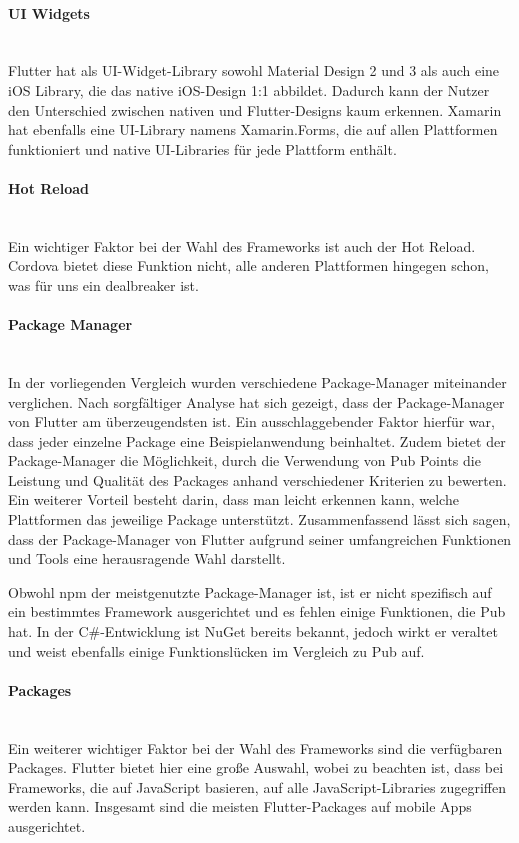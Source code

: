 \paragraph{UI Widgets}\mbox{} \\
Flutter hat als UI-Widget-Library sowohl Material Design 2 und 3 als auch eine iOS Library, die das native iOS-Design 1:1 abbildet. Dadurch kann der Nutzer den Unterschied zwischen nativen und Flutter-Designs kaum erkennen. Xamarin hat ebenfalls eine UI-Library namens Xamarin.Forms, die auf allen Plattformen funktioniert und native UI-Libraries für jede Plattform enthält.

\paragraph{Hot Reload}\mbox{} \\
Ein wichtiger Faktor bei der Wahl des Frameworks ist auch der Hot Reload. Cordova bietet diese Funktion nicht, alle anderen Plattformen hingegen schon, was für uns ein dealbreaker ist.

\paragraph{Package Manager}\mbox{} \\
In der vorliegenden Vergleich wurden verschiedene Package-Manager miteinander verglichen. Nach sorgfältiger Analyse hat sich gezeigt, dass der Package-Manager von Flutter am überzeugendsten ist. Ein ausschlaggebender Faktor hierfür war, dass jeder einzelne Package eine Beispielanwendung beinhaltet. Zudem bietet der Package-Manager die Möglichkeit, durch die Verwendung von Pub Points die Leistung und Qualität des Packages anhand verschiedener Kriterien zu bewerten. Ein weiterer Vorteil besteht darin, dass man leicht erkennen kann, welche Plattformen das jeweilige Package unterstützt. Zusammenfassend lässt sich sagen, dass der Package-Manager von Flutter aufgrund seiner umfangreichen Funktionen und Tools eine herausragende Wahl darstellt.


Obwohl npm der meistgenutzte Package-Manager ist, ist er nicht spezifisch auf ein bestimmtes Framework ausgerichtet und es fehlen einige Funktionen, die Pub hat. In der C\#-Entwicklung ist NuGet bereits bekannt, jedoch wirkt er veraltet und weist ebenfalls einige Funktionslücken im Vergleich zu Pub auf.

\paragraph{Packages}\mbox{} \\
Ein weiterer wichtiger Faktor bei der Wahl des Frameworks sind die verfügbaren Packages. Flutter bietet hier eine große Auswahl, wobei zu beachten ist, dass bei Frameworks, die auf JavaScript basieren, auf alle JavaScript-Libraries zugegriffen werden kann. Insgesamt sind die meisten Flutter-Packages auf mobile Apps ausgerichtet.

